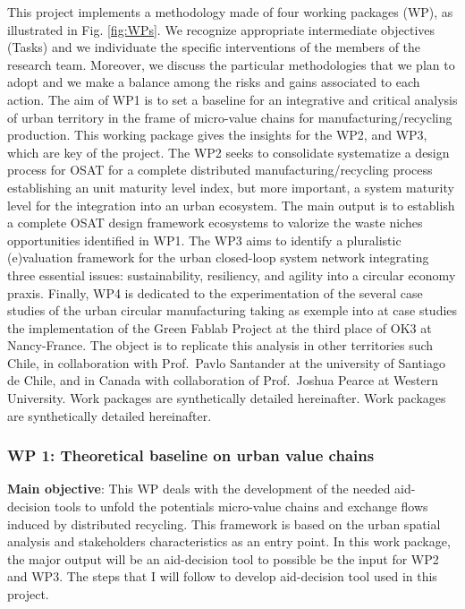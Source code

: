 \documentclass[
  12pt,
  a4paperpaper,
  onecolumn]{article}
\begin{document}
This project implements a methodology made of four working packages
(WP), as illustrated in Fig. \ref{fig:WPs}. We recognize appropriate
intermediate objectives (Tasks) and we individuate the specific
interventions of the members of the research team. Moreover, we discuss
the particular methodologies that we plan to adopt and we make a balance
among the risks and gains associated to each action. The aim of WP1 is
to set a baseline for an integrative and critical analysis of urban
territory in the frame of micro-value chains for manufacturing/recycling
production. This working package gives the insights for the WP2, and
WP3, which are key of the project. The WP2 seeks to consolidate
systematize a design process for OSAT for a complete distributed
manufacturing/recycling process establishing an unit maturity level
index, but more important, a system maturity level for the integration
into an urban ecosystem. The main output is to establish a complete OSAT
design framework ecosystems to valorize the waste niches opportunities
identified in WP1. The WP3 aims to identify a pluralistic (e)valuation
framework for the urban closed-loop system network integrating three
essential issues: sustainability, resiliency, and agility into a
circular economy praxis. Finally, WP4 is dedicated to the
experimentation of the several case studies of the urban circular
manufacturing taking as exemple into at case studies the implementation
of the Green Fablab Project at the third place of OK3 at Nancy-France.
The object is to replicate this analysis in other territories such
Chile, in collaboration with Prof.~Pavlo Santander at the university of
Santiago de Chile, and in Canada with collaboration of Prof.~Joshua
Pearce at Western University. Work packages are synthetically detailed
hereinafter. Work packages are synthetically detailed hereinafter.

\hypertarget{wp-1-theoretical-baseline-on-urban-value-chains}{%
\subsubsection{WP 1: Theoretical baseline on urban value
chains}\label{wp-1-theoretical-baseline-on-urban-value-chains}}

\textbf{Main objective}: This WP deals with the development of the
needed aid-decision tools to unfold the potentials micro-value chains
and exchange flows induced by distributed recycling. This framework is
based on the urban spatial analysis and stakeholders characteristics as
an entry point. In this work package, the major output will be an
aid-decision tool to possible be the input for WP2 and WP3. The steps
that I will follow to develop aid-decision tool used in this project.
\end{document}
